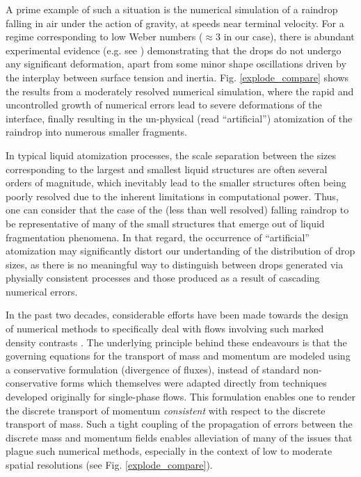 A prime example of such a situation is the numerical simulation of a 
raindrop falling in air under the action of gravity, at speeds near terminal velocity. 
For a regime corresponding to low Weber numbers ($\approx 3$ in our case), there is abundant experimental evidence 
(e.g. see \cite{drop_breakup}) demonstrating that the drops do not undergo any significant deformation, 
apart from some minor shape oscillations driven by the interplay between surface tension and inertia.  
Fig. \ref{explode_compare} shows the results from a moderately resolved numerical simulation, 
where the rapid and uncontrolled growth of numerical errors lead to severe deformations of the interface, 
finally resulting in the un-physical (read ``artificial'') atomization of the raindrop into numerous smaller fragments.


In typical liquid atomization processes, the scale separation
between the sizes corresponding to the largest and smallest liquid structures 
are often several orders of magnitude, which inevitably lead to the smaller 
structures often being poorly resolved due to the inherent limitations in computational power. 
Thus, one can consider that the case of the (less than well resolved) falling raindrop to be 
representative of many of the small structures that emerge out of liquid fragmentation phenomena. 
In that regard, the occurrence of ``artificial'' atomization may significantly distort 
our undertanding of the distribution of drop sizes, as there is no meaningful way 
to distinguish between drops generated via physially consistent processes and 
those produced as a result of cascading numerical errors. 





In the past two decades, considerable efforts have been made 
towards the design of numerical methods to specifically deal with 
flows involving such marked density contrasts
. 
The underlying principle behind these endeavours is that the governing 
equations for the transport of mass and momentum are modeled using a 
conservative formulation (divergence of fluxes), instead of standard 
non-conservative forms which themselves were adapted directly from 
techniques developed originally for single-phase flows. 
This formulation enables one to render the discrete transport of 
momentum \textit{consistent} with respect to the discrete transport of mass.  
Such a tight coupling of the propagation of errors between the discrete 
mass and momentum fields enables alleviation of many of the issues 
that plague such numerical methods, especially in the 
context of low to moderate spatial resolutions (see Fig. \ref{explode_compare}). 


